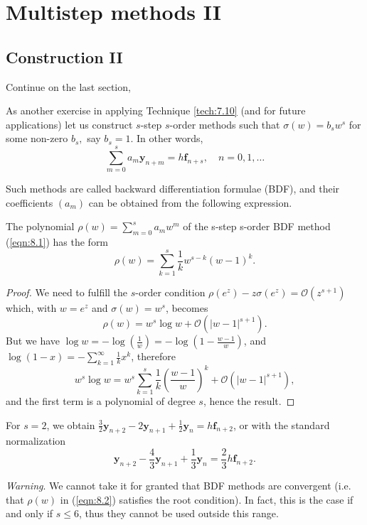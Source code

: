 \documentclass[a4paper]{article}
\begin{document}
\section{Multistep methods II}
\subsection{Construction II}

Continue on the last section, 
\begin{method}[BDF]
    As another exercise in applying Technique \ref{tech:7.10} (and for future applications) let us construct $s$-step $s$-order methods such that $\sigma(w) = b_s w^s$ for some non-zero $b_s,$ say $b_s=1$. In other words, 
    \begin{equation}\label{eqn:8.1}
        \sum_{m=0}^{s}a_m \mathbf{y}_{n+m }= h \mathbf{f}_{n+s},\quad n = 0,1,\dots
    \end{equation}
\end{method}
Such methods are called backward differentiation formulae (BDF), and their coefficients $\left(a_m\right)$ can be obtained from the following expression.

\begin{lemma}
    The polynomial $\rho(w)=\sum_{m=0}^s a_m w^m$ of the s-step s-order BDF method (\ref{eqn:8.1}) has the form
\begin{equation}\label{eqn:8.2}
    \rho(w)=\sum_{k=1}^s \frac{1}{k} w^{s-k}(w-1)^k .
\end{equation}
\end{lemma}
\begin{proof}
    We need to fulfill the $s$-order condition $\rho\left(e^z\right)-z \sigma\left(e^z\right)=\mathcal{O}\left(z^{s+1}\right)$ which, with $w=e^z$ and $\sigma(w)=w^s$, becomes
    \[
    \rho(w)=w^s \log w+\mathcal{O}\left(|w-1|^{s+1}\right) .
    \]
    But we have $\log w=-\log \left(\frac{1}{w}\right)=-\log \left(1-\frac{w-1}{w}\right)$, and $\log (1-x)=-\sum_{k=1}^{\infty} \frac{1}{k} x^k$, therefore
    \[
    w^s \log w=w^s \sum_{k=1}^s \frac{1}{k}\left(\frac{w-1}{w}\right)^k+\mathcal{O}\left(|w-1|^{s+1}\right),
    \]
    and the first term is a polynomial of degree $s$, hence the result.
\end{proof}

\begin{example}
    For $s=2$, we obtain $\frac{3}{2} \mathbf{y}_{n+2}-2 \mathbf{y}_{n+1}+\frac{1}{2} \mathbf{y}_n=h \mathbf{f}_{n+2}$, or with the standard normalization
    \[
    \mathbf{y}_{n+2}-\frac{4}{3} \mathbf{y}_{n+1}+\frac{1}{3} \mathbf{y}_n=\frac{2}{3} h \mathbf{f}_{n+2} .
    \]
\end{example}
\textit{Warning}. We cannot take it for granted that BDF methods are convergent (i.e. that $\rho(w)$ in (\ref{eqn:8.2}) satisfies the root condition). In fact, this is the case if and only if $s \leq 6$, thus they cannot be used outside this range.
\end{document}
